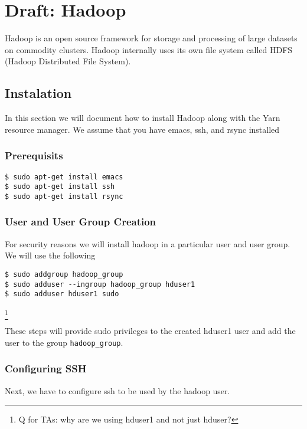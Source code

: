 \section{Draft: Hadoop}\label{hadoop}

Hadoop is an open source framework for storage and processing of large
datasets on commodity clusters. Hadoop internally uses its own file
system called HDFS (Hadoop Distributed File System). 


\subsection{Instalation}

In this section we will document how to install Hadoop along with the Yarn
resource manager. We assume that you have emacs, ssh, and rsync installed

\subsubsection{Prerequisits}

\begin{lstlisting}
$ sudo apt-get install emacs
$ sudo apt-get install ssh
$ sudo apt-get install rsync
\end{lstlisting}

\subsubsection{User and User Group Creation}

For security reasons we will install hadoop in a particular user and
user group. We will use the following

\begin{lstlisting}
$ sudo addgroup hadoop_group
$ sudo adduser --ingroup hadoop_group hduser1
$ sudo adduser hduser1 sudo
\end{lstlisting}

\footnote{Q for TAs: why are we using hduser1 and not just hduser?}

These steps will provide sudo privileges to the created hduser1
user and add the user to the group \verb|hadoop_group|.

\subsubsection{Configuring SSH}

Next, we have to configure ssh to be used by the hadoop user.

